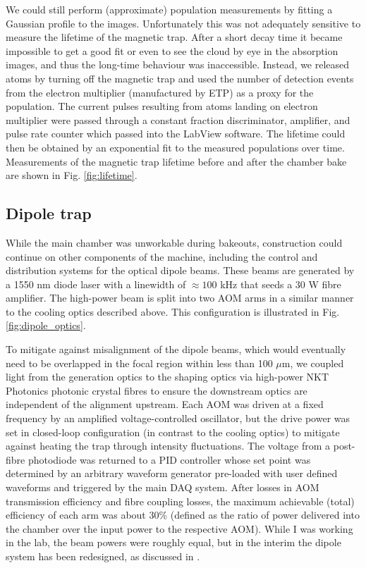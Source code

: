 	We could still perform (approximate) population measurements by fitting a Gaussian profile to the images.
	Unfortunately this was not adequately sensitive to measure the lifetime of the magnetic trap.
	After a short decay time it became impossible to get a good fit or even to see the cloud by eye in the absorption images, and thus the long-time behaviour was inaccessible.
	Instead, we released atoms by turning off the magnetic trap and used the number of detection events from the electron multiplier (manufactured by ETP) as a proxy for the population. 
	The current pulses resulting from atoms landing on electron multiplier were passed through a constant fraction discriminator, amplifier, and pulse rate counter which passed into the LabView software.
	The lifetime could then be obtained by an exponential fit to the measured populations over time.
	Measurements of the magnetic trap lifetime before and after the chamber bake are shown in Fig. \ref{fig:lifetime}.


	
	

\subsection{Dipole trap}
	While the main chamber was unworkable during bakeouts, construction could continue on other components of the machine, including the control and distribution systems for the optical dipole beams.
	These beams are generated by a 1550 nm diode laser with a linewidth of $\approx100$ kHz that seeds a 30 W fibre amplifier.
	The high-power beam is split into two AOM arms in a similar manner to the cooling optics described above.
	This configuration is illustrated  in Fig.	\ref{fig:dipole_optics}.
	
	To mitigate against misalignment of the dipole beams, which would eventually need to be overlapped in the focal region within less than 100 $\mu$m, we coupled light from the generation optics to the shaping optics via high-power NKT Photonics photonic crystal fibres to ensure the downstream optics are independent of the alignment upstream.
	Each AOM was driven at a fixed frequency by an amplified voltage-controlled oscillator, but the drive power was set in closed-loop configuration (in contrast to the cooling optics) to mitigate against heating the trap through intensity fluctuations.
	The voltage from a post-fibre photodiode was returned to a PID controller whose set point was determined by an arbitrary waveform generator pre-loaded with user defined waveforms and triggered by the main DAQ system.
	After losses in AOM transmission efficiency and fibre coupling losses, the maximum achievable (total) efficiency of each arm was about 30\% (defined as the ratio of power delivered into the chamber over the input power to the respective AOM).
	While I was working in the lab, the beam powers were roughly equal, but in the interim the dipole system has been redesigned, as discussed in \cite{Abbas21}.

